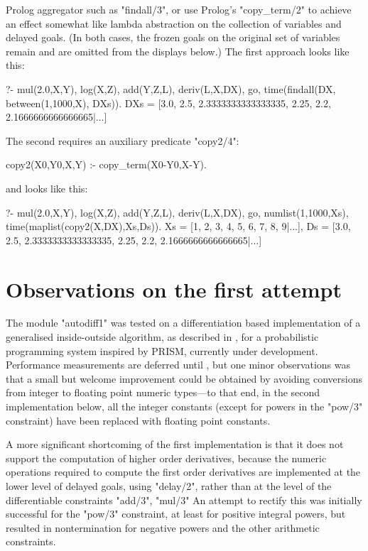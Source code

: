 Prolog aggregator such as "findall/3", or use Prolog's "copy_term/2" to achieve an effect
somewhat like lambda abstraction on the collection of variables and delayed goals. (In both
cases, the frozen goals on the original set of variables remain and are omitted from the
displays below.)
The first approach looks like this:
\begin{prolog-barred}
	?- mul(2.0,X,Y), log(X,Z), add(Y,Z,L), deriv(L,X,DX), go, 
	   time(findall(DX, between(1,1000,X), DXs)).
	DXs = [3.0, 2.5, 2.3333333333333335, 2.25, 2.2, 2.1666666666666665|...]
\end{prolog-barred}
The second requires an auxiliary predicate "copy2/4":
\begin{prolog}
	copy2(X0,Y0,X,Y) :- copy_term(X0-Y0,X-Y).
\end{prolog}
and looks like this:
\begin{prolog-barred}
	?- mul(2.0,X,Y), log(X,Z), add(Y,Z,L), deriv(L,X,DX), go, 
     numlist(1,1000,Xs), time(maplist(copy2(X,DX),Xs,Ds)).
	Xs = [1, 2, 3, 4, 5, 6, 7, 8, 9|...],
	Ds = [3.0, 2.5, 2.3333333333333335, 2.25, 2.2, 2.1666666666666665|...]
\end{prolog-barred}


\section{Observations on the first attempt}

The module "autodiff1" was tested on a differentiation based implementation 
of a generalised inside-outside algorithm, as described in ,
for a probabilistic programming system inspired by PRISM, currently under development.
Performance measurements are deferred until , but one minor
observations was that a small but welcome improvement could be obtained by avoiding
conversions from integer to floating point numeric types---to that end, in the
second implementation below, all the integer constants (except for powers in the
"pow/3" constraint) have been replaced with floating point constants.

A more significant shortcoming of the first implementation is that it does not 
support the computation of higher order derivatives, because the numeric
operations required to compute the first order derivatives are implemented at
the lower level of delayed goals, using "delay/2", rather than at the level of the
differentiable constraints "add/3", "mul/3" \etc An attempt to rectify this was
initially successful for the "pow/3" constraint, at least for positive integral
powers, but resulted in nontermination for negative powers and the other
arithmetic constraints.

